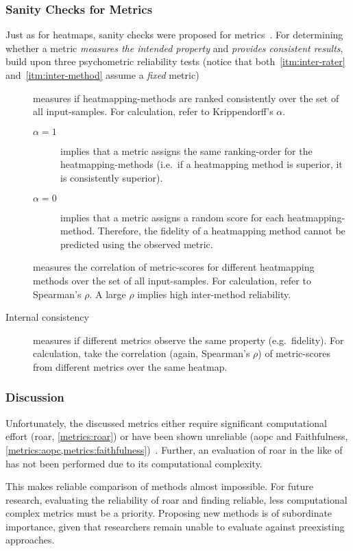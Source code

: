 \subsubsection{Sanity Checks for Metrics}\label{metrics:sanity-checks}
Just as for heatmaps, sanity checks were proposed for metrics~\cite{Tomsett.2019}. For determining whether a metric \textit{measures the intended property} and \textit{provides consistent results}, \citeauthor{Tomsett.2019} build upon three psychometric reliability tests (notice that both~\ref{itm:inter-rater} and~\ref{itm:inter-method} assume a \textit{fixed} metric)
\begin{description}
    \item[] measures if heatmapping-methods are ranked consistently over the set of all input-samples.
    For calculation, \citeauthor{Tomsett.2019} refer to Krippendorff's \(\alpha\).
    \begin{description}
        \item[\(\alpha = 1\)] implies that a metric assigns the same ranking-order for the heatmapping-methods (i.e.\ if a heatmapping method is superior, it is consistently superior). 
        \item[\(\alpha = 0\)] implies that a metric assigns a random score for each heatmapping-method. Therefore, the fidelity of a heatmapping method cannot be predicted using the observed metric.
    \end{description} 
    \item[] measures the correlation of metric-scores for different heatmapping methods over the set of all input-samples. For calculation, \citeauthor{Tomsett.2019} refer to Spearman's \(\rho\). A large \(\rho\) implies high inter-method reliability.
    \item[Internal consistency] measures if different metrics observe the same property (e.g.\ fidelity). For calculation, \citeauthor{Tomsett.2019} take the correlation (again, Spearman's \(\rho\)) of metric-scores from different metrics over the same heatmap.
\end{description}

\subsubsection{Discussion}\label{metrics:discussion}
Unfortunately, the discussed metrics either require significant computational effort (\gls{roar}, \cref{metrics:roar}) or have been shown unreliable (\gls{aopc} and Faithfulness, \cref{metrics:aopc,metrics:faithfulness})~\cite{Hooker.2019,Tomsett.2019}. Further, an evaluation of \gls{roar} in the like of  has not been performed due to its computational complexity.
\par
This makes reliable comparison of methods almost impossible. For future research, evaluating the reliability of \gls{roar} and finding reliable, less computational complex metrics must be a priority. Proposing new methods is of subordinate importance, given that researchers remain unable to evaluate against preexisting approaches.